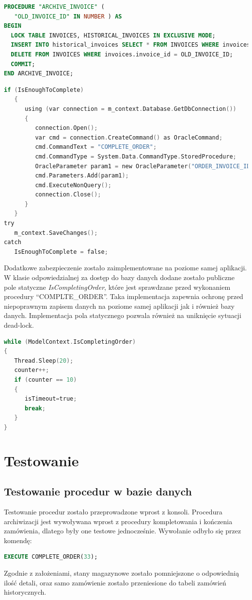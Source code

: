 \documentclass{article}
\begin{document}
\begin{lstlisting}[language=sql, frame=single,tabsize=1,breaklines=true, caption={Procedura ARCHIVE\_INVOICE}]
   PROCEDURE "ARCHIVE_INVOICE" (
   "OLD_INVOICE_ID" IN NUMBER ) AS 
BEGIN
  LOCK TABLE INVOICES, HISTORICAL_INVOICES IN EXCLUSIVE MODE;
  INSERT INTO historical_invoices SELECT * FROM INVOICES WHERE invoices.invoice_id = OLD_INVOICE_ID;
  DELETE FROM INVOICES WHERE invoices.invoice_id = OLD_INVOICE_ID;
  COMMIT;
END ARCHIVE_INVOICE;
\end{lstlisting}
\begin{lstlisting}[language=C, frame=single,tabsize=1,caption={Kod aplikacji wywołujący procedurę COMPLETE\_ORDER}]
if (IsEnoughToComplete)
   {
      using (var connection = m_context.Database.GetDbConnection())
      {
         connection.Open();
         var cmd = connection.CreateCommand() as OracleCommand;
         cmd.CommandText = "COMPLETE_ORDER";
         cmd.CommandType = System.Data.CommandType.StoredProcedure;
         OracleParameter param1 = new OracleParameter("ORDER_INVOICE_ID", InvoiceID);
         cmd.Parameters.Add(param1);
         cmd.ExecuteNonQuery();
         connection.Close();
      }
   }
try
   m_context.SaveChanges();
catch
   IsEnoughToComplete = false;
\end{lstlisting}

Dodatkowe zabezpieczenie zostało zaimplementowane na poziome samej aplikacji. W
klasie odpowiedzialnej za dostęp do bazy danych dodane zostało publiczne pole
statyczne \textit{IsCompletingOrder}, które jest sprawdzane przed wykonaniem
procedury ``COMPLTE\_ORDER''. Taka implementacja zapewnia ochronę przed
niepoprawnym zapisem danych na poziome samej aplikacji jak i również bazy
danych. Implementacja pola statycznego pozwala również na uniknięcie sytuacji
dead-lock.
\begin{lstlisting}[language=C,frame=single]
while (ModelContext.IsCompletingOrder)
{
   Thread.Sleep(20);
   counter++;
   if (counter == 10)
   {
      isTimeout=true;
      break;
   }
}
\end{lstlisting}

\section{Testowanie}
\subsection{Testowanie procedur w bazie danych}
Testowanie procedur zostało przeprowadzone wprost z konsoli. Procedura
archiwizacji jest wywoływana wprost z procedury kompletowania i kończenia
zamówienia, dlatego były one testowe jednocześnie. Wywołanie odbyło się przez
komendę:
\begin{lstlisting}[language=sql]
   EXECUTE COMPLETE_ORDER(33);
\end{lstlisting}
Zgodnie z założeniami, stany magazynowe zostało pomniejszone o odpowiednią ilość
detali, oraz samo zamówienie zostało przeniesione do tabeli zamówień
historycznych.
\end{document}
